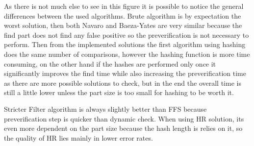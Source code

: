 As there is not much else to see in this figure it is possible to notice the general differences between the used algorithms. Brute algorithm is by expectation the worst solution, then both Navaro and Baeza-Yates are very similar because the find part does not find any false positive so the preverification is not necessary to perform. Then from the implemented solutions the first algorithm using hashing does the same number of comparisons, however the hashing function is more time consuming, on the other hand if the hashes are performed only once it significantly improves the find time while also increasing the preverification time as there are more possible solutions to check, but in the end the overall time is still a little lower unless the part size is too small for hashing to be worth it.

Stricter Filter algorithm is always slightly better than FFS because preverification step is quicker than dynamic check. When using HR solution, its even more dependent on the part size because the hash length is relies on it, so the quality of HR lies mainly in lower error rates.

